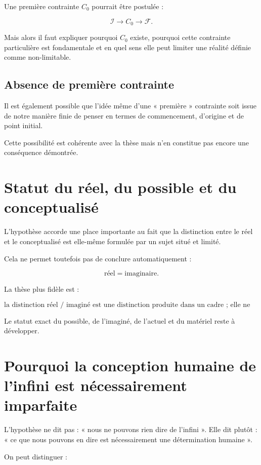 \documentclass[11pt,a4paper]{article}
\newcommand{\Inf}{\mathcal I}
\newcommand{\Fin}{\mathcal F}
\begin{document}
Une première contrainte \(C_0\) pourrait être postulée :

\[
\Inf \longrightarrow C_0 \longrightarrow \Fin.
\]

Mais alors il faut expliquer pourquoi \(C_0\) existe, pourquoi cette contrainte particulière est fondamentale et en quel sens elle peut limiter une réalité définie comme non-limitable.

\subsection{Absence de première contrainte}

Il est également possible que l'idée même d'une « première » contrainte soit issue de notre manière finie de penser en termes de commencement, d'origine et de point initial.

Cette possibilité est cohérente avec la thèse mais n'en constitue pas encore une conséquence démontrée.

\section{Statut du réel, du possible et du conceptualisé}

L'hypothèse accorde une place importante au fait que la distinction entre le réel et le conceptualisé est elle-même formulée par un sujet situé et limité.

Cela ne permet toutefois pas de conclure automatiquement :

\[
\text{réel} = \text{imaginaire}.
\]

La thèse plus fidèle est :

\[
\boxed{
\text{la distinction réel / imaginé est une distinction produite dans un cadre ; elle ne doit pas être confondue avec une frontière ontologique absolue.}
}
\]

Le statut exact du possible, de l'imaginé, de l'actuel et du matériel reste à développer.

\section{Pourquoi la conception humaine de l'infini est nécessairement imparfaite}

L'hypothèse ne dit pas : « nous ne pouvons rien dire de l'infini ». Elle dit plutôt : « ce que nous pouvons en dire est nécessairement une détermination humaine ».

On peut distinguer :
\end{document}
